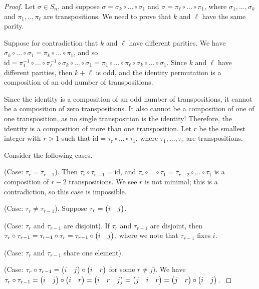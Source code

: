 \begin{proof}
    Let $\sigma \in S_n$, and suppose $\sigma = \sigma_k \circ ... \circ \sigma_1$ and $\sigma = \pi_\ell \circ ... \circ \pi_1$, where $\sigma_1, ..., \sigma_k$ and $\pi_1, .., \pi_\ell$ are transpositions. We need to prove that $k$ and $\ell$ have the same parity.
    
    Suppose for contradiction that $k$ and $\ell$ have different parities. We have $\sigma_k \circ ... \circ \sigma_1 = \pi_k \circ ... \circ \pi_1$, and so $\text{id} = \pi_1^{-1} \circ ... \circ \pi_\ell^{-1} \circ \sigma_k \circ ... \circ \sigma_1 = \pi_1 \circ ... \circ \pi_\ell \circ \sigma_k \circ ... \circ \sigma_1$. Since $k$ and $\ell$ have different parities, then  $k + \ell$ is odd, and the identity permutation is a composition of an odd number of transpositions.
    
    Since the identity is a composition of an odd number of transpositions, it cannot be a composition of zero transpositions. It also cannot be a composition of one of one transposition, as no single transposition is the identity! Therefore, the identity is a composition of more than one transposition. Let $r$ be the smallest integer with $r > 1$ such that $\text{id} = \tau_r \circ ... \circ \tau_1$, where $\tau_1, ..., \tau_r$ are transpositions.
    
    Consider the following cases.

    (Case: $\tau_r = \tau_{r - 1}$). Then $\tau_r \circ \tau_{r - 1} = \text{id}$, and $\tau_r \circ ... \circ \tau_1 = \tau_{r - 2} \circ ... \circ \tau_1$ is a composition of $r - 2$ transpositions. We see $r$ is not minimal; this is a contradiction, so this case is impossible.

    (Case: $\tau_r \neq \tau_{r - 1}$). Suppose $\tau_r = \begin{pmatrix} i & j \end{pmatrix}$.
    
    \fullindent
    {
        (Case: $\tau_r$ and $\tau_{r - 1}$ are disjoint). If $\tau_r$ and $\tau_{r - 1}$ are disjoint, then $\tau_r \circ \tau_{r - 1} = \tau_{r - 1} \circ \tau_r = \tau_{r - 1} \circ \begin{pmatrix} i & j \end{pmatrix}$, where we note that $\tau_{r - 1}$ fixes $i$.
    
        (Case: $\tau_r$ and $\tau_{r - 1}$ share one element).
    
        \fullindent
        {
            \fullindent
            {
                (Case: $\tau_r \circ \tau_{r - 1} = \begin{pmatrix} i & j \end{pmatrix} \circ \begin{pmatrix} i & r \end{pmatrix}$ for some $r \neq j$). We have $\tau_r \circ \tau_{r - 1} = \begin{pmatrix} i & j \end{pmatrix} \circ \begin{pmatrix} i & r \end{pmatrix} = \begin{pmatrix} i & r & j \end{pmatrix} = \begin{pmatrix} j & i & r \end{pmatrix} = \begin{pmatrix} j & r \end{pmatrix} \circ \begin{pmatrix} i & j \end{pmatrix}$. 
            }

}}
\end{proof}
